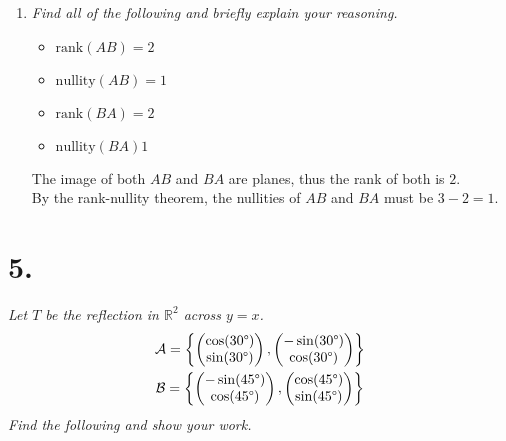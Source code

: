 \documentclass[12pt]{article}
\begin{document}
\begin{enumerate}[label=(\alph*)]
	\item \textit{Find all of the following and briefly explain your
	reasoning.}
	\begin{itemize}
		\item $\text{rank}(AB) = 2$
		\item $\text{nullity}(AB) = 1$
		\item $\text{rank}(BA) = 2$
		\item $\text{nullity}(BA) 1$
	\end{itemize}
	The image of both $AB$ and $BA$ are planes, thus the rank of both is $2$. \\
	By the rank-nullity theorem, the nullities of $AB$ and $BA$ must be
	$3 - 2 = 1$.
\end{enumerate}
\newpage

\section*{5.}
\textit{Let $T$ be the reflection in $\mathbb{R}^2$ across $y=x$.}
\begin{gather*}
	\mathcal{A}
	=
	\left\{
		\begin{pmatrix} \cos(30 \degree) \\ \sin(30 \degree) \end{pmatrix},
		\begin{pmatrix} -\sin(30 \degree) \\ \cos(30 \degree) \end{pmatrix}
	\right\}
	\\
	\mathcal{B}
	=
	\left\{
		\begin{pmatrix} -\sin(45 \degree) \\ \cos(45 \degree) \end{pmatrix},
		\begin{pmatrix} \cos(45 \degree) \\ \sin(45 \degree) \end{pmatrix}
	\right\}
\end{gather*}
\textit{Find the following and show your work.}
\end{document}
